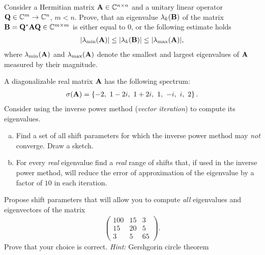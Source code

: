 
\begin{Sheet}

  \begin{Problem}
    Consider a Hermitian matrix $\mathbf A\in\mathbb C^{n\times n}$ and a unitary
    linear operator $\mathbf Q\in\mathbb C^m\to\mathbb C^n$, $m<n$. Prove, that an
    eigenvalue $\lambda_k(\mathbf B)$ of the matrix
    $\mathbf B=\mathbf Q^*\mathbf A\mathbf Q\in\mathbb C^{m\times m}$ is either equal to 0,
    or the following estimate holds
    \begin{gather*}
      \lvert\lambda_{\min}(\mathbf A)\rvert
      \leq \lvert\lambda_{k}(\mathbf B)\rvert
      \leq \lvert\lambda_{\max}(\mathbf A)\rvert,
    \end{gather*}
    where $\lambda_{\min}(\mathbf A)$ and $\lambda_{\max}(\mathbf A)$ denote
    the smallest and largest eigenvalues of $\mathbf A$ measured by their
    magnitude.
  \end{Problem}

  \begin{Problem}
    A diagonalizable real matrix $\mathbf A$ has the following spectrum:
    \begin{gather*}
      \sigma(\mathbf A) = \left\{-2,\ 1-2i,\ 1+2i,\ 1,\ -i,\ i,\ 2\right\}.
    \end{gather*}
    Consider using the inverse power method (\textit{vector
      iteration}) to compute its eigenvalues.
    \begin{enumerate}[(a)]
    \item Find a set of all shift parameters for which the inverse
      power method may \textit{not} converge. Draw a sketch.
    \item For every \textit{real} eigenvalue find a \textit{real}
      range of shifts that, if used in the inverse power method, will
      reduce the error of approximation of the eigenvalue by a factor
      of $10$ in each iteration.
    \end{enumerate}
  \end{Problem}

  \begin{Problem}
    \label{problem:shift}
    Propose shift parameters that will allow you to compute
    \textit{all} eigenvalues and eigenvectors of the matrix
    \begin{gather*}
      \begin{pmatrix}
        100 & 15 & 3 \\
         15 & 20 & 5 \\
          3 &  5 & 65
      \end{pmatrix}
      .
    \end{gather*}
    Prove that your choice is correct.  \textit{Hint:} Gershgorin
    circle theorem
  \end{Problem}


\end{Sheet}

